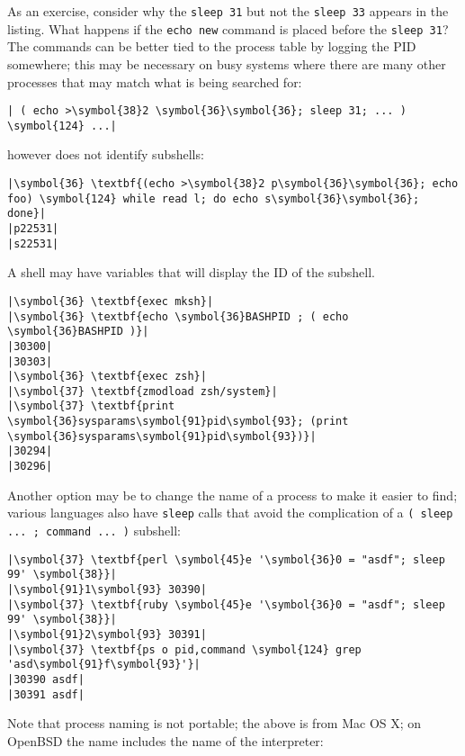 \documentclass[10pt,a4paper]{article}
\begin{document}
As an exercise, consider why the \texttt{sleep 31} but not the
\texttt{sleep 33} appears in the listing. What happens if the
\texttt{echo new} command is placed before the \texttt{sleep 31}? \\

The commands can be better tied to the process table by logging the PID
somewhere; this may be necessary on busy systems where there are many
other processes that may match what is being searched for:

\begin{lstlisting}
| ( echo >\symbol{38}2 \symbol{36}\symbol{36}; sleep 31; ... ) \symbol{124} ...|
\end{lstlisting}

\texttt{} however does not identify subshells:

\begin{lstlisting}
|\symbol{36} \textbf{(echo >\symbol{38}2 p\symbol{36}\symbol{36}; echo foo) \symbol{124} while read l; do echo s\symbol{36}\symbol{36}; done}|
|p22531|
|s22531|
\end{lstlisting}

A shell may have variables that will display the ID of the subshell.

\begin{lstlisting}
|\symbol{36} \textbf{exec mksh}|
|\symbol{36} \textbf{echo \symbol{36}BASHPID ; ( echo \symbol{36}BASHPID )}|
|30300|
|30303|
|\symbol{36} \textbf{exec zsh}|
|\symbol{37} \textbf{zmodload zsh/system}|
|\symbol{37} \textbf{print \symbol{36}sysparams\symbol{91}pid\symbol{93}; (print \symbol{36}sysparams\symbol{91}pid\symbol{93})}|
|30294|
|30296|
\end{lstlisting}

Another option may be to change the name of a process to make it easier
to find; various languages also have \texttt{sleep} calls that avoid the
complication of a \texttt{( sleep ... ; command ... )} subshell:

\begin{lstlisting}
|\symbol{37} \textbf{perl \symbol{45}e '\symbol{36}0 = "asdf"; sleep 99' \symbol{38}}|
|\symbol{91}1\symbol{93} 30390|
|\symbol{37} \textbf{ruby \symbol{45}e '\symbol{36}0 = "asdf"; sleep 99' \symbol{38}}|
|\symbol{91}2\symbol{93} 30391|
|\symbol{37} \textbf{ps o pid,command \symbol{124} grep 'asd\symbol{91}f\symbol{93}'}|
|30390 asdf|
|30391 asdf|
\end{lstlisting}

Note that process naming is not portable; the above is from Mac OS X; on
OpenBSD the name includes the name of the interpreter:
\end{document}

